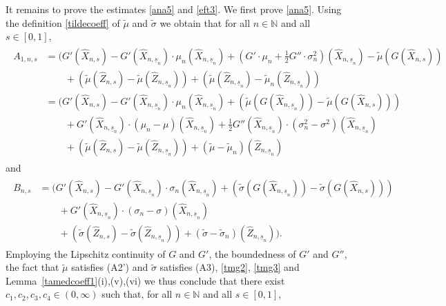 \documentclass[11pt]{amsart}
\newcommand{\N}{{\mathbb N}}
\newcommand{\eul}{{\widehat X}}
\newcommand{\eultr}{{\widehat Z}}
\newcommand{\usn}{\underline {s}_n}
\theoremstyle{plain}
\theoremstyle{definition}
\begin{document}
It remains to prove  the estimates \eqref{ana5} and \eqref{eft3}.
We first prove \eqref{ana5}.
Using the definition \eqref{tildecoeff} of $\widetilde \mu$ and $\widetilde\sigma$ we obtain that for all $n\in\N$ and all $s\in [0,1]$,
\begin{align*}
	\begin{aligned}
	A_{1,n,s} & = \bigl(G'(\eul_{n,s})- G'(\eul_{n,\usn})\cdot  \mu_n(\eul_{n,\usn}) + (G'\cdot  \mu_n+\tfrac{1}{2}G''\cdot\sigma_n^2)(\eul_{n,\usn}) - \widetilde \mu(G(\widehat X_{n,s})) \\
			& \qquad +(	\widetilde \mu(\eultr_{n,s}) -\widetilde \mu(\eultr_{n,\usn}) ) + (	\widetilde \mu(\eultr_{n,\usn}) - \widetilde \mu_n(\eultr_{n,\usn}))\\
		& = \bigl(G'(\eul_{n,s})- G'(\eul_{n,\usn})\cdot  \mu_n(\eul_{n,\usn}) +  (\widetilde \mu(G(\widehat X_{n,\usn})) - \widetilde \mu(G(\widehat X_{n,s})))\\
		& \qquad + G'(\widehat X_{n,\usn})\cdot(  \mu_n   - \mu)(\widehat X_{n,\usn}) +\tfrac{1}{2}G''(\widehat X_{n,\usn})\cdot     (\sigma_n^2- \sigma^2)(\eul_{n,\usn})  \\
		& \qquad +(	\widetilde \mu(\eultr_{n,s}) -\widetilde \mu(\eultr_{n,\usn}) ) + (	\widetilde \mu- \widetilde \mu_n)(\eultr_{n,\usn})
	\end{aligned}
\end{align*}
and
\begin{align*}
	\begin{aligned}
		B_{n,s}
		& = \bigl(G'(\eul_{n,s})- G'(\eul_{n,\usn})\cdot  \sigma_n(\eul_{n,\usn}) +  (\widetilde \sigma(G(\widehat X_{n,\usn})) - \widetilde \sigma(G(\widehat X_{n,s})))\\
		& \qquad + G'(\widehat X_{n,\usn})\cdot(  \sigma_n   - \sigma)(\widehat X_{n,\usn})  \\
		& \qquad +(	\widetilde \sigma(\eultr_{n,s}) -\widetilde \sigma(\eultr_{n,\usn}) ) + (	\widetilde \sigma- \widetilde \sigma_n)(\eultr_{n,\usn})).	
	\end{aligned}
\end{align*}
Employing the Lipschitz continuity of $G$ and $G'$, the boundedness of $G'$
and $G''$,
the fact that $\widetilde\mu$ satisfies (A2') and $\widetilde\sigma$  satisfies (A3),
\eqref{tmg2}, \eqref{tmg3} and Lemma~\ref{tamedcoeff1}(i),(v),(vi) we thus conclude that there exist $c_1,c_2,c_3,c_4\in (0,\infty)$ such that, for all $n\in\N$ and all $s\in [0,1]$,
\end{document}
